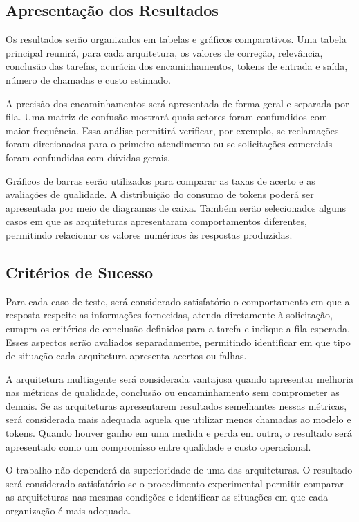 \documentclass[11pt]{ifscarticle}
\begin{document}
\subsection{Apresentação dos Resultados}

Os resultados serão organizados em tabelas e gráficos comparativos. Uma tabela principal reunirá, para cada arquitetura, os valores de correção, relevância, conclusão das tarefas, acurácia dos encaminhamentos, tokens de entrada e saída, número de chamadas e custo estimado.

A precisão dos encaminhamentos será apresentada de forma geral e separada por fila. Uma matriz de confusão mostrará quais setores foram confundidos com maior frequência. Essa análise permitirá verificar, por exemplo, se reclamações foram direcionadas para o primeiro atendimento ou se solicitações comerciais foram confundidas com dúvidas gerais.

Gráficos de barras serão utilizados para comparar as taxas de acerto e as avaliações de qualidade. A distribuição do consumo de tokens poderá ser apresentada por meio de diagramas de caixa. Também serão selecionados alguns casos em que as arquiteturas apresentaram comportamentos diferentes, permitindo relacionar os valores numéricos às respostas produzidas.

\subsection{Critérios de Sucesso}

Para cada caso de teste, será considerado satisfatório o comportamento em que a resposta respeite as informações fornecidas, atenda diretamente à solicitação, cumpra os critérios de conclusão definidos para a tarefa e indique a fila esperada. Esses aspectos serão avaliados separadamente, permitindo identificar em que tipo de situação cada arquitetura apresenta acertos ou falhas.

A arquitetura multiagente será considerada vantajosa quando apresentar melhoria nas métricas de qualidade, conclusão ou encaminhamento sem comprometer as demais. Se as arquiteturas apresentarem resultados semelhantes nessas métricas, será considerada mais adequada aquela que utilizar menos chamadas ao modelo e tokens. Quando houver ganho em uma medida e perda em outra, o resultado será apresentado como um compromisso entre qualidade e custo operacional.

O trabalho não dependerá da superioridade de uma das arquiteturas. O resultado será considerado satisfatório se o procedimento experimental permitir comparar as arquiteturas nas mesmas condições e identificar as situações em que cada organização é mais adequada.
\end{document}
